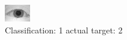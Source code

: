 \begin{figure}[h!]
\begin{center}
\includegraphics[width=0.60\columnwidth]{figures/ID990_class_1_target_2.png}
\end{center}
\caption{ Classification: 1 actual target: 2}
\label{fig:ID990_class_1_target_2}
\end{figure}
